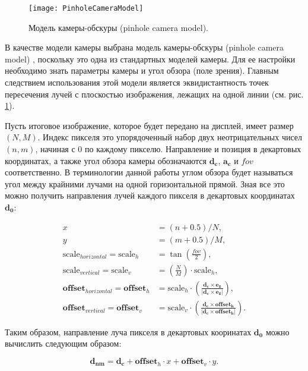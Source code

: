 \begin{figure}[h]
    \centering
    \texttt{[image: PinholeCameraModel]}
    \caption{Модель камеры-обскуры (pinhole camera model).}
    \label{fig:pinhole_camera}
\end{figure}

В качестве модели камеры выбрана модель камеры-обскуры \linebreak(pinhole camera model) \cite[стр.~47]{marrs2021ray}, поскольку это одна из стандартных моделей камеры. Для ее настройки необходимо знать параметры камеры и угол обзора (поле зрения). Главным следствием использования этой модели является эквидистантность точек пересечения лучей с плоскостью изображения, лежащих на одной линии (см. рис. \ref{fig:pinhole_camera}).

Пусть итоговое изображение, которое будет передано на дисплей, имеет размер $(N, M)$. Индекс пикселя это упорядоченный набор двух неотрицательных чисел $(n, m)$, начиная с $0$ по каждому пикселю. Направление и позиция в декартовых координатах, а также угол обзора камеры обозначаются $\mathbf{d_c}$, $\mathbf{a_c}$ и $fov$ соответственно. В терминологии данной работы углом обзора будет называться угол между крайними лучами на одной горизонтальной прямой. Зная все это можно получить направления лучей каждого пикселя в декартовых координатах $\mathbf{d_0}$:

\begin{align*}
    x &= (n + 0.5)/N, \\
    y &= (m + 0.5)/M, \\
    \text{scale}_{horizontal} = \text{scale}_h &= \tan{\left(\frac{fov}{2}\right)}, \\
    \text{scale}_{vertical} = \text{scale}_v &= \left(\frac{N}{M}\right) \cdot \text{scale}_h, \\
    \mathbf{offset}_{horizontal} = \mathbf{offset}_h &= \text{scale}_h \cdot \left(\frac{\mathbf{d_c} \times \mathbf{e_z}}{\left|\mathbf{d_c} \times \mathbf{e_z}\right|}\right), \\
    \mathbf{offset}_{vertical} = \mathbf{offset}_v &= \text{scale}_v \cdot \left(\frac{\mathbf{d_c} \times \mathbf{offset_h}}{\left|\mathbf{d_c} \times \mathbf{offset_h}\right|}\right).
\end{align*}

Таким образом, направление луча пикселя в декартовых кооринатах $\mathbf{d_0}$ можно вычислить следующим образом:

\begin{equation}
\label{eq:init_rays}
    \mathbf{d_{nm}} = \mathbf{d_c} + \mathbf{offset}_{h} \cdot x + \mathbf{offset}_{v} \cdot y.
\end{equation}

